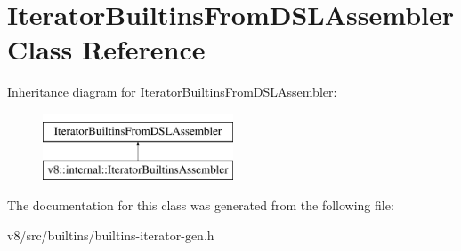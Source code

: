 \hypertarget{classIteratorBuiltinsFromDSLAssembler}{}\section{Iterator\+Builtins\+From\+D\+S\+L\+Assembler Class Reference}
\label{classIteratorBuiltinsFromDSLAssembler}
Inheritance diagram for Iterator\+Builtins\+From\+D\+S\+L\+Assembler\+:\begin{figure}[H]
\begin{center}
\leavevmode
\includegraphics[height=2.000000cm]{classIteratorBuiltinsFromDSLAssembler}
\end{center}
\end{figure}


The documentation for this class was generated from the following file\+:\begin{DoxyCompactItemize}
\item 
v8/src/builtins/builtins-\/iterator-\/gen.\+h\end{DoxyCompactItemize}
